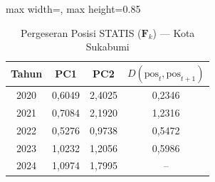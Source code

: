 \begin{table}[H]
\centering
\caption{Pergeseran Posisi STATIS ($\mathbf{F}_k$) --- Kota Sukabumi} \label{tab:app1jarak_statis_skor_kota_sukabumi}
\begin{adjustbox}{max width=\textwidth, max height=0.85\textheight}
\begin{tabular}{|c|c|c|c|}
\hline
\textbf{Tahun} & \textbf{PC1} & \textbf{PC2} & \textbf{$D(\text{pos}_t, \text{pos}_{t+1})$} \\
\hline
2020 & 0,6049 & 2,4025 & 0,2346 \\
2021 & 0,7084 & 2,1920 & 1,2316 \\
2022 & 0,5276 & 0,9738 & 0,5472 \\
2023 & 1,0232 & 1,2056 & 0,5986 \\
2024 & 1,0974 & 1,7995 & -- \\
\hline
\end{tabular}
\end{adjustbox}
\end{table}